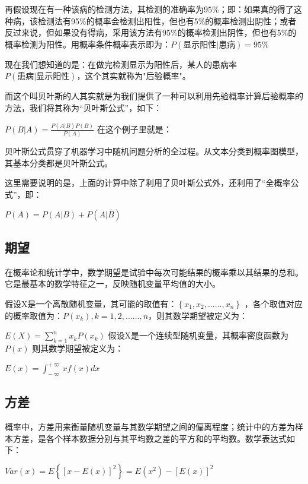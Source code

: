 \documentclass[11pt]{book}
\newcounter{#2}
\newcounter{#2}[#1]
\numberwithin{#2}{#1}
\begin{document}
再假设现在有一种该病的检测方法，其检测的准确率为$ 95\% $；即：如果真的得了这种病，该检测法有95\%的概率会检测出阳性，但也有5\%的概率检测出阴性；或者反过来说，但如果没有得病，采用该方法有95\%的概率检测出阴性，但也有5\%的概率检测为阳性。用概率条件概率表示即为：$ P(显示阳性|患病)=95\% $

现在我们想知道的是：在做完检测显示为阳性后，某人的患病率$ P(患病|显示阳性) $，这个其实就称为"后验概率"。

而这个叫贝叶斯的人其实就是为我们提供了一种可以利用先验概率计算后验概率的方法，我们将其称为“贝叶斯公式”，如下：

$ P\left( B|A \right) =\frac{P\left( A|B \right)P\left( B\right)  }{P\left( A \right) }  $
在这个例子里就是：

贝叶斯公式贯穿了机器学习中随机问题分析的全过程。从文本分类到概率图模型，其基本分类都是贝叶斯公式。

这里需要说明的是，上面的计算中除了利用了贝叶斯公式外，还利用了“全概率公式”，即：

$ P\left( A \right) =P\left( A|B \right)+P\left( A|\bar{B}  \right)   $

\subsection{期望}

在概率论和统计学中，数学期望是试验中每次可能结果的概率乘以其结果的总和。它是最基本的数学特征之一，反映随机变量平均值的大小。

假设$  $X是一个离散随机变量，其可能的取值有：$ \left\{ x_{1} ,x_{2} ,......,x_{n}  \right\} $ ，各个取值对应的概率取值为：$ P\left( x_{k} \right)  , k=1,2,......,n $，则其数学期望被定义为：

$ E\left(X \right) =\sum_{k=1}^{n}{x_{k} P\left( x_{k}  \right) }  $
假设X是一个连续型随机变量，其概率密度函数为$ P\left( x \right) $ 则其数学期望被定义为：

$ E\left( x \right) =\int_{-\varpi }^{+\varpi } xf\left( x \right) dx $

\subsection{方差 }

概率中，方差用来衡量随机变量与其数学期望之间的偏离程度；统计中的方差为样本方差，是各个样本数据分别与其平均数之差的平方和的平均数。数学表达式如下： 

$ Var\left( x \right) =E\left\{ \left[ x-E\left( x \right)  \right] ^{2}   \right\} =E\left( x^{2}  \right) -\left[ E\left( x \right)  \right] ^{2}  $
\end{document}
